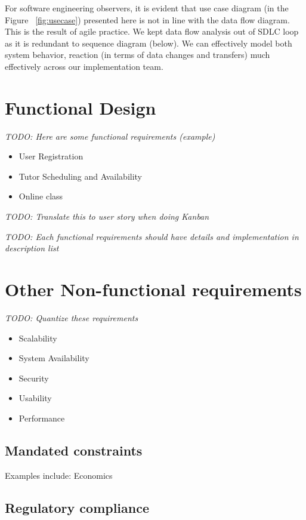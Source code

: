 For software engineering observers, it is evident that use case diagram (in the Figure ~\ref{fig:usecase}) presented here is not in line with the data flow diagram. This is the result of agile practice. We kept data flow analysis out of SDLC loop as it is redundant to sequence diagram (below). We can effectively model both system behavior, reaction (in terms of data changes and transfers) much effectively across our implementation team.

\section{Functional Design}

\textit{TODO: Here are some functional requirements (example)}

\begin{itemize}
	\item User Registration
	\item Tutor Scheduling and Availability
	\item Online class
\end{itemize}

\textit{TODO: Translate this to user story when doing Kanban}

\textit{TODO: Each functional requirements should have details and implementation in description list}

\section{Other Non-functional requirements}

\textit{TODO: Quantize these requirements}

\begin{itemize}
	\item Scalability
	\item System Availability
	\item Security
	\item Usability
	\item Performance
\end{itemize}

\subsection{Mandated constraints}

Examples include: Economics

\subsection{Regulatory compliance}

\clearpage